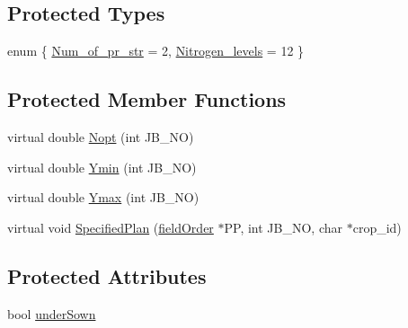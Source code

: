 \subsection*{Protected Types}
\begin{DoxyCompactItemize}
\item 
enum \{ \hyperlink{classstatic_oat_a808f6377ccb3b9c79bfcc29f9c59144bae5b4b14454be7e35979e97c3f11ea3d6}{Num\_\-of\_\-pr\_\-str} = 2, 
\hyperlink{classstatic_oat_a808f6377ccb3b9c79bfcc29f9c59144ba89ce7fa90d4e02bcda8a9408cca76e2c}{Nitrogen\_\-levels} = 12
 \}
\end{DoxyCompactItemize}
\subsection*{Protected Member Functions}
\begin{DoxyCompactItemize}
\item 
virtual double \hyperlink{classstatic_oat_a070016c89c425653b34ae9bb6cc55739}{Nopt} (int JB\_\-NO)
\item 
virtual double \hyperlink{classstatic_oat_aff0b5a68a133cbd31864cab9cb6df147}{Ymin} (int JB\_\-NO)
\item 
virtual double \hyperlink{classstatic_oat_afcb9f339277f591080a6b5b250072ddf}{Ymax} (int JB\_\-NO)
\item 
virtual void \hyperlink{classstatic_oat_a9d47d1105b60fba4f7c96764bf6229d2}{SpecifiedPlan} (\hyperlink{classfield_order}{fieldOrder} $\ast$PP, int JB\_\-NO, char $\ast$crop\_\-id)
\end{DoxyCompactItemize}
\subsection*{Protected Attributes}
\begin{DoxyCompactItemize}
\item 
bool \hyperlink{classstatic_oat_a09face4bc9d635b749592908aab7b5a8}{underSown}
\end{DoxyCompactItemize}


